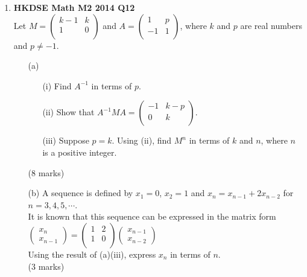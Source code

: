 \documentclass[12pt]{article}
\begin{document}
\begin{enumerate}
	\item \textbf{HKDSE Math M2 2014 Q12}\\
	Let $M = \begin{pmatrix}
		k-1&k\\
		1  &0\\
	\end{pmatrix}$ and $A = \begin{pmatrix}
		1&p\\
		-1&1\\
	\end{pmatrix}$, where $k$ and $p$ are real numbers and $p \neq -1$. 
	\begin{enumerate}
		\item [(a)]
		\begin{enumerate}
			\item [(i)]Find $A^{-1}$ in terms of $p$. 
			\item [(ii)]Show that $A^{-1}MA =  
			\begin{pmatrix}
				-1&k-p\\
				0 &k\\
			\end{pmatrix}$. 
			\item [(iii)]Suppose $p = k$. Using (ii), find $M^n$ in terms of $k$ and $n$, where $n$ is a positive integer.
		\end{enumerate}
		(8 marks)
		\item [(b)]A sequence is defined by $x_1 = 0$, $x_2 = 1$ and $x_n = x_{n-1} + 2x_{n-2}$ for $n = 3,4,5,\cdots$. \\
			It is known that this sequence can be expressed in the matrix form $\begin{pmatrix} x_n\\x_{n-1} \end{pmatrix} = \begin{pmatrix} 1&2\\1&0\\ \end{pmatrix}\begin{pmatrix} x_{n-1}\\x_{n-2} \end{pmatrix}$\\
			Using the result of (a)(iii), express $x_n$ in terms of $n$. \\(3 marks)
	\end{enumerate}


\end{enumerate}
\end{document}
